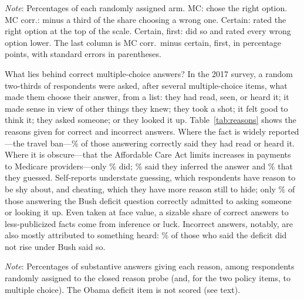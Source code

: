 \documentclass[11pt]{article}
\begin{document}
\begin{table}[htbp]
\centering\TableStyle
\caption{Knowledge by multiple choice and by confidence rating.}
\label{tab:formats}
\begin{minipage}{0.95\linewidth}\footnotesize
\emph{Note}: Percentages of each randomly assigned arm. MC: chose the right option. MC corr.: minus a third of the share choosing a wrong one. Certain: rated the right option at the top of the scale. Certain, first: did so and rated every wrong option lower. The last column is MC corr.\ minus certain, first, in percentage points, with standard errors in parentheses.
\end{minipage}
\end{table}

What lies behind correct multiple-choice answers? In the 2017 survey, a random two-thirds of respondents were asked, after several multiple-choice items, what made them choose their answer, from a list: they had read, seen, or heard it; it made sense in view of other things they knew; they took a shot; it felt good to think it; they asked someone; or they looked it up. Table~\ref{tab:reasons} shows the reasons given for correct and incorrect answers. Where the fact is widely reported---the travel ban---\heardBan\% of those answering correctly said they had read or heard it. Where it is obscure---that the Affordable Care Act limits increases in payments to Medicare providers---only \heardAca\% did; \inferAca\% said they inferred the answer and \guessAca\% that they guessed. Self-reports understate guessing, which respondents have reason to be shy about, and cheating, which they have more reason still to hide; only \lookedBush\% of those answering the Bush deficit question correctly admitted to asking someone or looking it up. Even taken at face value, a sizable share of correct answers to less-publicized facts come from inference or luck. Incorrect answers, notably, are also mostly attributed to something heard: \heardBushWrong\% of those who said the deficit did not rise under Bush said so.

\begin{table}[htbp]
\centering\TableStyle
\caption{Reasons given for multiple-choice answers, 2017 MTurk survey.}
\label{tab:reasons}
\begin{minipage}{0.95\linewidth}\footnotesize
\emph{Note}: Percentages of substantive answers giving each reason, among respondents randomly assigned to the closed reason probe (and, for the two policy items, to multiple choice). The Obama deficit item is not scored (see text).
\end{minipage}
\end{table}
\end{document}
